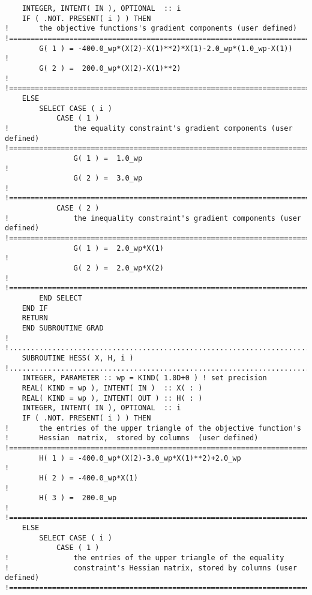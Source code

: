 \documentclass{article}
\begin{document}
\begin{lstlisting}
    INTEGER, INTENT( IN ), OPTIONAL  :: i
    IF ( .NOT. PRESENT( i ) ) THEN
!       the objective functions's gradient components (user defined)
!==============================================================================
        G( 1 ) = -400.0_wp*(X(2)-X(1)**2)*X(1)-2.0_wp*(1.0_wp-X(1))           !
        G( 2 ) =  200.0_wp*(X(2)-X(1)**2)                                     !
!==============================================================================
    ELSE
        SELECT CASE ( i )
            CASE ( 1 )
!               the equality constraint's gradient components (user defined)
!==============================================================================
                G( 1 ) =  1.0_wp                                              !
                G( 2 ) =  3.0_wp                                              !
!==============================================================================
            CASE ( 2 )
!               the inequality constraint's gradient components (user defined)
!==============================================================================
                G( 1 ) =  2.0_wp*X(1)                                         !
                G( 2 ) =  2.0_wp*X(2)                                         !
!==============================================================================
        END SELECT
    END IF
    RETURN
    END SUBROUTINE GRAD
!
!.............................................................................
    SUBROUTINE HESS( X, H, i )
!.............................................................................
    INTEGER, PARAMETER :: wp = KIND( 1.0D+0 ) ! set precision
    REAL( KIND = wp ), INTENT( IN )  :: X( : )
    REAL( KIND = wp ), INTENT( OUT ) :: H( : )
    INTEGER, INTENT( IN ), OPTIONAL  :: i
    IF ( .NOT. PRESENT( i ) ) THEN
!       the entries of the upper triangle of the objective function's
!       Hessian  matrix,  stored by columns  (user defined)
!==============================================================================
        H( 1 ) = -400.0_wp*(X(2)-3.0_wp*X(1)**2)+2.0_wp                       !
        H( 2 ) = -400.0_wp*X(1)                                               !
        H( 3 ) =  200.0_wp                                                    !
!==============================================================================
    ELSE
        SELECT CASE ( i )
            CASE ( 1 )
!               the entries of the upper triangle of the equality
!               constraint's Hessian matrix, stored by columns (user defined)
!==============================================================================

\end{lstlisting}
\end{document}
